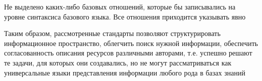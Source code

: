 \begin{SCn}
{\begin{scnitemize}
		\item Не выделено каких-либо базовых отношений, которые бы записывались на уровне синтаксиса базового языка. Все отношения приходится указывать явно
		\item Таким образом, рассмотренные стандарты позволяют структурировать информационное пространство, облегчить поиск нужной информации, обеспечить согласованность описания ресурсов различными авторами, т.е. успешно решают те задачи, для которых они создавались, но не могут рассматриваться как универсальные языки представления информации любого рода в базах знаний
	\end{scnitemize}
}
\scnendstruct
	
\end{SCn}